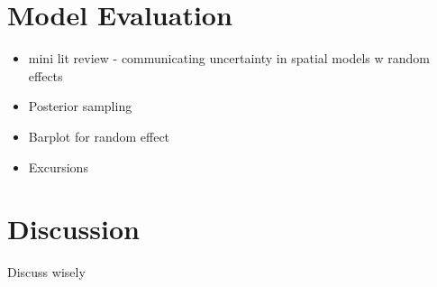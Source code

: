 \documentclass[preprint,12pt]{elsarticle}
\begin{document}
\section{Model Evaluation}

\begin{itemize}
	\item mini lit review - communicating uncertainty in spatial models w random effects
\end{itemize}

\begin{itemize}
	\item Posterior sampling
	\item Barplot for random effect
	\item Excursions
\end{itemize}

\section{Discussion}

Discuss wisely



\end{document}
